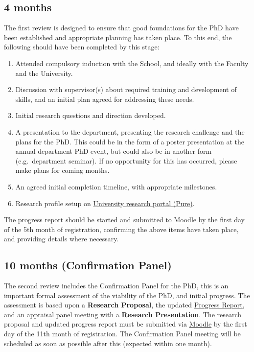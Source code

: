 \documentclass[12pt,a4paper]{article}
\begin{document}
\subsection{4 months} \label{sec:4months}
The first review is designed to ensure that good foundations for the PhD have been established and appropriate planning has taken place. To this end, the following should have been completed by this stage:
\begin{enumerate}
\item Attended compulsory induction with the School, and ideally with the Faculty and the University.
\item Discussion with supervisor(s) about required training and development of skills, and an initial plan agreed for addressing these needs.
\item Initial research questions and direction developed.
\item A presentation to the department, presenting the research challenge and the plans for the PhD. This could be in the form of a poster presentation at the annual department PhD event, but could also be in another form (e.g.\ department seminar). If no opportunity for this has occurred, please make plans for coming months.
\item An agreed initial completion timeline, with appropriate milestones.
\item Research profile setup on \href{https://pure.lancs.ac.uk}{University research portal (Pure)}.
\end{enumerate}

The \hyperref[sec:report]{progress report} should be started and submitted to \href{https://modules.lancaster.ac.uk/course/view.php?id=7050}{Moodle} by the first day of the 5th month of registration, confirming the above items have taken place, and providing details where necessary.


\subsection{10 months (Confirmation Panel)} \label{sec:10months}
The second review includes the Confirmation Panel for the PhD, this is an important formal assessment of the viability of the PhD, and initial progress. The assessment is based upon a \textbf{Research Proposal}, the updated \hyperref[sec:report]{Progress Report}, and an appraisal panel meeting with a \textbf{Research Presentation}. The research proposal and updated progress report must be submitted via \href{https://modules.lancaster.ac.uk/course/view.php?id=7050}{Moodle} by the first day of the 11th month of registration. The Confirmation Panel meeting will be scheduled as soon as possible after this (expected within one month).
\end{document}
